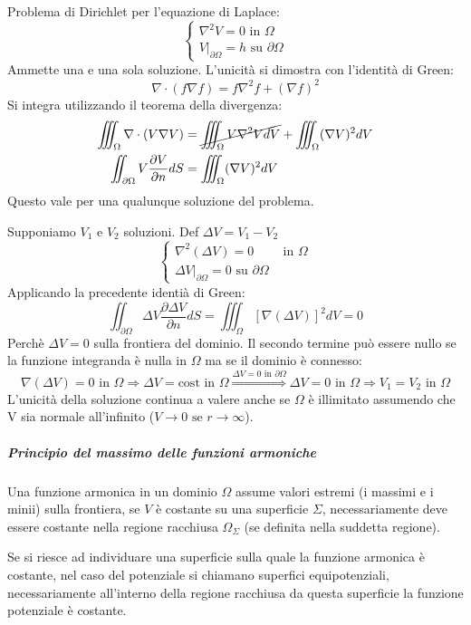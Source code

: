 Problema di Dirichlet per l'equazione di Laplace:
$$
\begin{cases}
\nabla^2 V = 0 \text{ in } \Omega\\
\left.V\right|_{\partial\Omega} = h \text{ su } \partial\Omega
\end{cases}
$$
Ammette una e una sola soluzione.
L'unicità si dimostra con l'identità di Green:
$$
\nabla\cdot(f\nabla f) = f\nabla^2f + (\nabla f)^2
$$
Si integra utilizzando il teorema della divergenza:
$$
\begin{aligned}
\iiint_\Omega \nabla\cdot(V\nabla V) &= \cancel{\iiint_\Omega V\nabla^2 V dV} + \iiint_\Omega (\nabla V)^2 dV\\
\iint_{\partial\Omega} V \frac{\partial V}{\partial n}dS &= \iiint_\Omega (\nabla V)^2 dV
\end{aligned}
$$
Questo vale per una qualunque soluzione del problema.

Supponiamo $V_1$ e $V_2$ soluzioni. Def $\Delta V = V_1 - V_2$ 
$$
\begin{cases}
\nabla^2 (\Delta V) = 0 & \text{ in }\Omega \\
\left.\Delta V\right|_{\partial \Omega} = 0 \text{ su } \partial \Omega
\end{cases}
$$
Applicando la precedente identià di Green:
$$
\iint_{\partial \Omega} \Delta V \frac{\partial \Delta V}{\partial n} dS =
\iiint_\Omega \left[\nabla(\Delta V)\right]^2 dV = 0
$$
Perchè $\Delta V = 0$ sulla frontiera del dominio.
Il secondo termine può essere nullo se la funzione integranda è nulla in $\Omega$ ma se il dominio
è connesso:
$$
\nabla(\Delta V) = 0 \text{ in } \Omega \Rightarrow \Delta V = \text{cost in } \Omega \stackrel{\Delta V = 0 \text{ in }\partial\Omega}{\Rightarrow}
\Delta V = 0 \text{ in } \Omega \Rightarrow V_1 = V_2 \text{ in } \Omega
$$
L'unicità della soluzione continua a valere anche se $\Omega$ è illimitato assumendo che V sia 
normale all'infinito ($V \to 0 \text{ se } r \to \infty$).

\subparagraph{Principio del massimo delle funzioni armoniche}
Una funzione armonica in un dominio $\Omega$ assume valori estremi (i massimi e i minii) sulla
frontiera, se $V$ è costante su una superficie $\Sigma$, necessariamente deve essere costante
nella regione racchiusa $\Omega_\Sigma$ (se definita nella suddetta regione).

Se si riesce ad individuare una superficie sulla quale la funzione armonica è costante, nel caso
del potenziale si chiamano superfici equipotenziali, necessariamente all'interno della regione
racchiusa da questa superficie la funzione potenziale è costante.

